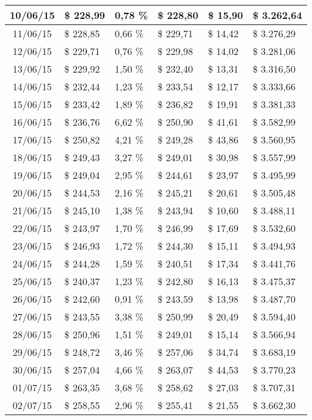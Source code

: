 \begin{small}
\begin{longtable}{|c|l|l|l|l|l|}
10/06/15 & \$ 228,99 & 0,78 \% & \$ 228,80 & \$ 15,90 & \$ 3.262,64 \\ \hline
11/06/15 & \$ 228,85 & 0,66 \% & \$ 229,71 & \$ 14,42 & \$ 3.276,29 \\ \hline
12/06/15 & \$ 229,71 & 0,76 \% & \$ 229,98 & \$ 14,02 & \$ 3.281,06 \\ \hline
13/06/15 & \$ 229,92 & 1,50 \% & \$ 232,40 & \$ 13,31 & \$ 3.316,50 \\ \hline
14/06/15 & \$ 232,44 & 1,23 \% & \$ 233,54 & \$ 12,17 & \$ 3.333,66 \\ \hline
15/06/15 & \$ 233,42 & 1,89 \% & \$ 236,82 & \$ 19,91 & \$ 3.381,33 \\ \hline
16/06/15 & \$ 236,76 & 6,62 \% & \$ 250,90 & \$ 41,61 & \$ 3.582,99 \\ \hline
17/06/15 & \$ 250,82 & 4,21 \% & \$ 249,28 & \$ 43,86 & \$ 3.560,95 \\ \hline
18/06/15 & \$ 249,43 & 3,27 \% & \$ 249,01 & \$ 30,98 & \$ 3.557,99 \\ \hline
19/06/15 & \$ 249,04 & 2,95 \% & \$ 244,61 & \$ 23,97 & \$ 3.495,99 \\ \hline
20/06/15 & \$ 244,53 & 2,16 \% & \$ 245,21 & \$ 20,61 & \$ 3.505,48 \\ \hline
21/06/15 & \$ 245,10 & 1,38 \% & \$ 243,94 & \$ 10,60 & \$ 3.488,11 \\ \hline
22/06/15 & \$ 243,97 & 1,70 \% & \$ 246,99 & \$ 17,69 & \$ 3.532,60 \\ \hline
23/06/15 & \$ 246,93 & 1,72 \% & \$ 244,30 & \$ 15,11 & \$ 3.494,93 \\ \hline
24/06/15 & \$ 244,28 & 1,59 \% & \$ 240,51 & \$ 17,34 & \$ 3.441,76 \\ \hline
25/06/15 & \$ 240,37 & 1,23 \% & \$ 242,80 & \$ 16,13 & \$ 3.475,37 \\ \hline
26/06/15 & \$ 242,60 & 0,91 \% & \$ 243,59 & \$ 13,98 & \$ 3.487,70 \\ \hline
27/06/15 & \$ 243,55 & 3,38 \% & \$ 250,99 & \$ 20,49 & \$ 3.594,40 \\ \hline
28/06/15 & \$ 250,96 & 1,51 \% & \$ 249,01 & \$ 15,14 & \$ 3.566,94 \\ \hline
29/06/15 & \$ 248,72 & 3,46 \% & \$ 257,06 & \$ 34,74 & \$ 3.683,19 \\ \hline
30/06/15 & \$ 257,04 & 4,66 \% & \$ 263,07 & \$ 44,53 & \$ 3.770,23 \\ \hline
01/07/15 & \$ 263,35 & 3,68 \% & \$ 258,62 & \$ 27,03 & \$ 3.707,31 \\ \hline
02/07/15 & \$ 258,55 & 2,96 \% & \$ 255,41 & \$ 21,55 & \$ 3.662,30 \\ \hline

\end{longtable}
\end{small}
